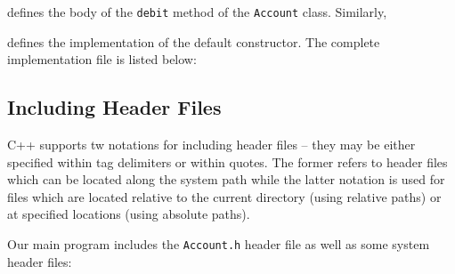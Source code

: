\noindent
defines the body of the \verb+debit+ method of the \verb+Account+ class. Similarly,


\noindent
defines the implementation of the default constructor. The complete implementation
file is listed below:

\noindent{\small }


\subsection{Including Header Files}

C++ supports tw notations for including header files -- they may be either specified
within tag delimiters or within quotes. The former refers to header files which can 
be located along the system path while the latter notation is used for files which
are located relative to the current directory (using relative paths) or at specified
locations (using absolute paths). 

Our main program includes the \verb+Account.h+ header file as well as some system
header files:


\noindent{\small }

